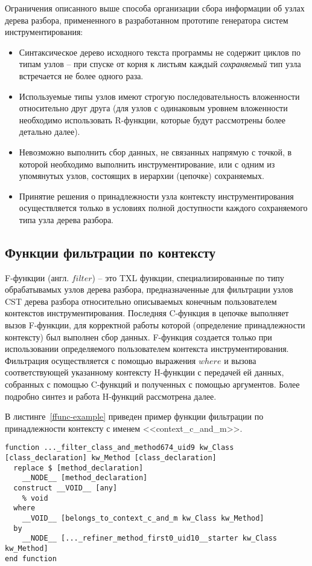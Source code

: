 Ограничения описанного выше способа организации сбора информации об узлах дерева разбора, примененного в разработанном прототипе генератора систем инструментирования:
\begin{itemize}[noitemsep]
  \item Синтаксическое дерево исходного текста программы не содержит циклов по типам узлов -- при спуске от корня к листьям каждый \textit{сохраняемый} тип узла встречается не более одного раза.
  \item Используемые типы узлов имеют строгую последовательность вложенности относительно друг друга (для узлов с одинаковым уровнем вложенности необходимо использовать R-функции, которые будут рассмотрены более детально далее).
  \item Невозможно выполнить сбор данных, не связанных напрямую с точкой, в которой необходимо выполнить инструментирование, или с одним из упомянутых узлов, состоящих в иерархии (цепочке) сохраняемых.
  \item Принятие решения о принадлежности узла контексту инструментирования осуществляется только в условиях полной доступности каждого сохраняемого типа узла дерева разбора.
\end{itemize}

\subsection{Функции фильтрации по контексту}

F-функции (англ. $filter$) -- это TXL функции, специализированные по типу обрабатывамых узлов дерева разбора, предназначенные для фильтрации узлов CST дерева разбора относительно описываемых конечным пользователем контекстов инструментирования.
Последняя C-функция в цепочке выполняет вызов F-функции, для корректной работы которой (определение принадлежности контексту) был выполнен сбор данных.
F-функция создается только при использовании определяемого пользователем контекста инструментирования.
Фильтрация осуществляется с помощью выражения $where$ и вызова соответствующей указанному контексту H-функции с передачей ей данных, собранных с помощью C-функций и полученных с помощью аргументов.
Более подробно синтез и работа H-функций рассмотрена далее.

В листинге~\ref{ffunc-example} приведен пример функции фильтрации по принадлежности контексту с именем <<context\_c\_and\_m>>.

\begin{lstlisting}[language=TXL, label={ffunc-example}, caption={Пример синтезированной F-функции.}]
function ..._filter_class_and_method674_uid9 kw_Class [class_declaration] kw_Method [class_declaration]
  replace $ [method_declaration]
    __NODE__ [method_declaration]
  construct __VOID__ [any]
    % void
  where
    __VOID__ [belongs_to_context_c_and_m kw_Class kw_Method]
  by
    __NODE__ [..._refiner_method_first0_uid10__starter kw_Class kw_Method]
end function
\end{lstlisting}

